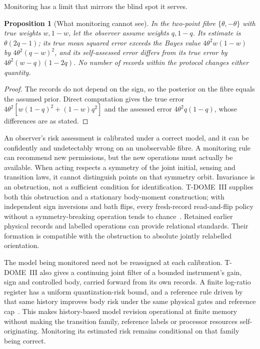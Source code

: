 \documentclass[12pt]{article}
\newtheorem{proposition}[theorem]{Proposition}
\theoremstyle{definition}
\theoremstyle{remark}
\begin{document}
Monitoring has a limit that mirrors the blind spot it serves.

\begin{proposition}[What monitoring cannot see]\label{prop:blindmonitor}
In the two-point fibre $\{\theta,-\theta\}$ with true weights $w,1-w$, let the observer assume weights $q,1-q$. Its estimate is $\theta(2q-1)$; its true mean squared error exceeds the Bayes value $4\theta^2w(1-w)$ by $4\theta^2(q-w)^2$, and its self-assessed error differs from its true error by $4\theta^2(w-q)(1-2q)$. No number of records within the protocol changes either quantity.
\end{proposition}

\begin{proof}
The records do not depend on the sign, so the posterior on the fibre equals the assumed prior. Direct computation gives the true error $4\theta^2[w(1-q)^2+(1-w)q^2]$ and the assessed error $4\theta^2q(1-q)$, whose differences are as stated.
\end{proof}

An observer's risk assessment is calibrated under a correct model, and it can be confidently and undetectably wrong on an unobservable fibre. A monitoring rule can recommend new permissions, but the new operations must actually be available. When acting respects a symmetry of the joint initial, sensing and transition laws, it cannot distinguish points on that symmetry orbit. Invariance is an obstruction, not a sufficient condition for identification. T-DOME~III supplies both this obstruction and a stationary body-moment construction; with independent sign inversions and bath flips, every fresh-record read-and-flip policy without a symmetry-breaking operation tends to chance~\cite{TDOMEIII}. Retained earlier physical records and labelled operations can provide relational standards. Their formation is compatible with the obstruction to absolute jointly relabelled orientation.

The model being monitored need not be reassigned at each calibration. T-DOME~III also gives a continuing joint filter of a bounded instrument's gain, sign and controlled body, carried forward from its own records. A finite log-ratio register has a uniform quantization-risk bound, and a reference rule driven by that same history improves body risk under the same physical gates and reference cap~\cite{TDOMEIII}. This makes history-based model revision operational at finite memory without making the transition family, reference labels or processor resources self-originating. Monitoring its estimated risk remains conditional on that family being correct.
\end{document}
